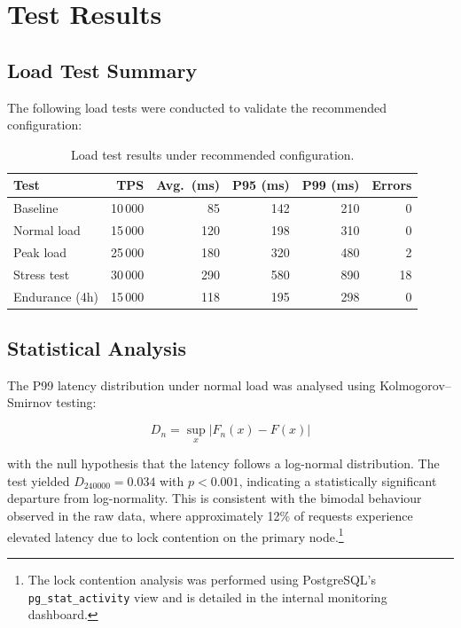 \documentclass[
    language=english,
    doctype=technical-report,
    institution=none,
    titlestyle=book,
    oneside,
    loadGlossaries,
]{../../omnilatex}
\begin{document}
\chapter{Test Results}
\label{app:test-results}

\section{Load Test Summary}

The following load tests were conducted to validate the recommended
configuration:

\begin{table}[htbp]
    \centering
    \caption{Load test results under recommended configuration.}
    \label{tab:load-tests}
    \begin{tabular}{@{}lrrrrr@{}}
        \toprule
        Test & TPS & Avg.\ (ms) & P95 (ms) & P99 (ms) & Errors \\
        \midrule
        Baseline        & 10\,000 & 85  & 142 & 210 & 0 \\
        Normal load     & 15\,000 & 120 & 198 & 310 & 0 \\
        Peak load       & 25\,000 & 180 & 320 & 480 & 2 \\
        Stress test     & 30\,000 & 290 & 580 & 890 & 18 \\
        Endurance (4h)  & 15\,000 & 118 & 195 & 298 & 0 \\
        \bottomrule
    \end{tabular}
\end{table}

\section{Statistical Analysis}

The P99 latency distribution under normal load was analysed using
Kolmogorov--Smirnov testing:

\begin{equation}
    D_n = \sup_x |F_n(x) - F(x)|
    \label{eq:ks-statistic}
\end{equation}

with the null hypothesis that the latency follows a log-normal
distribution. The test yielded $D_{240000} = 0.034$ with $p < 0.001$,
indicating a statistically significant departure from log-normality.
This is consistent with the bimodal behaviour observed in the raw data,
where approximately 12\% of requests experience elevated latency due to
lock contention on the primary node.\footnote{The lock contention
analysis was performed using PostgreSQL's \texttt{pg\_stat\_activity}
view and is detailed in the internal monitoring dashboard.}
\end{document}
